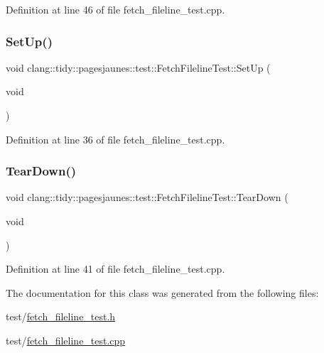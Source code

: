 Definition at line 46 of file fetch\+\_\+fileline\+\_\+test.\+cpp.

\mbox{\label{classclang_1_1tidy_1_1pagesjaunes_1_1test_1_1_fetch_fileline_test_ac285b9978e5990458a05b4f7605074aa}} 
\subsubsection{\texorpdfstring{Set\+Up()}{SetUp()}}
{\footnotesize\ttfamily void clang\+::tidy\+::pagesjaunes\+::test\+::\+Fetch\+Fileline\+Test\+::\+Set\+Up (\begin{DoxyParamCaption}\item[{void}]{ }\end{DoxyParamCaption})\hspace{0.3cm}{\ttfamily [virtual]}}



Definition at line 36 of file fetch\+\_\+fileline\+\_\+test.\+cpp.

\mbox{\label{classclang_1_1tidy_1_1pagesjaunes_1_1test_1_1_fetch_fileline_test_a5fae484f2916c11ae5477cdd86fa348e}} 
\subsubsection{\texorpdfstring{Tear\+Down()}{TearDown()}}
{\footnotesize\ttfamily void clang\+::tidy\+::pagesjaunes\+::test\+::\+Fetch\+Fileline\+Test\+::\+Tear\+Down (\begin{DoxyParamCaption}\item[{void}]{ }\end{DoxyParamCaption})\hspace{0.3cm}{\ttfamily [virtual]}}



Definition at line 41 of file fetch\+\_\+fileline\+\_\+test.\+cpp.



The documentation for this class was generated from the following files\+:\begin{DoxyCompactItemize}
\item 
test/\hyperlink{fetch__fileline__test_8h}{fetch\+\_\+fileline\+\_\+test.\+h}\item 
test/\hyperlink{fetch__fileline__test_8cpp}{fetch\+\_\+fileline\+\_\+test.\+cpp}\end{DoxyCompactItemize}
